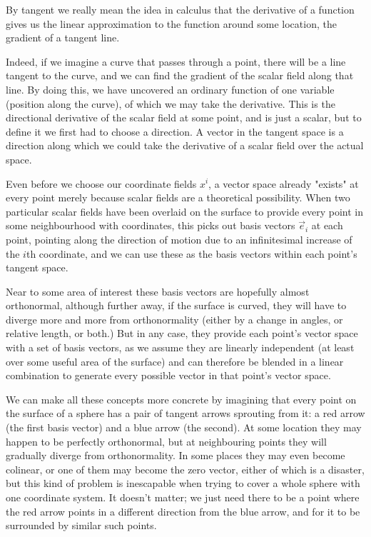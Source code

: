 By tangent we really mean the idea in calculus that the derivative of a function gives us the linear approximation to the function around some location, the gradient of a tangent line. 

Indeed, if we imagine a curve that passes through a point, there will be a line tangent to the curve, and we can find the gradient of the scalar field along that line. By doing this, we have uncovered an ordinary function of one variable (position along the curve), of which we may take the derivative. This is the directional derivative of the scalar field at some point, and is just a scalar, but to define it we first had to choose a direction. A vector in the tangent space is a direction along which we could take the derivative of a scalar field over the actual space.

Even before we choose our coordinate fields $x^i$, a vector space already "exists" at every point merely because scalar fields are a theoretical possibility. When two particular scalar fields have been overlaid on the surface to provide every point in some neighbourhood with coordinates, this picks out basis vectors $\vec{e}_i$ at each point, pointing along the direction of motion due to an infinitesimal increase of the $i$th coordinate, and we can use these as the basis vectors within each point's tangent space.

Near to some area of interest these basis vectors are hopefully almost orthonormal, although further away, if the surface is curved, they will have to diverge more and more from orthonormality (either by a change in angles, or relative length, or both.) But in any case, they provide each point's vector space with a set of basis vectors, as we assume they are linearly independent (at least over some useful area of the surface) and can therefore be blended in a linear combination to generate every possible vector in that point's vector space. 

We can make all these concepts more concrete by imagining that every point on the surface of a sphere has a pair of tangent arrows sprouting from it: a red arrow (the first basis vector) and a blue arrow (the second). At some location they may happen to be perfectly orthonormal, but at neighbouring points they will gradually diverge from orthonormality. In some places they may even become colinear, or one of them may become the zero vector, either of which is a disaster, but this kind of problem is inescapable when trying to cover a whole sphere with one coordinate system. It doesn't matter; we just need there to be a point where the red arrow points in a different direction from the blue arrow, and for it to be surrounded by similar such points.

